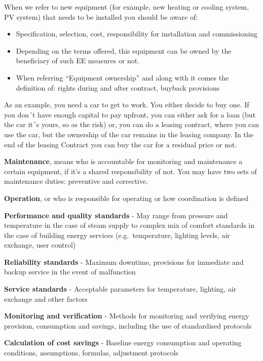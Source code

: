 \documentclass[]{book}
\theoremstyle{definition}
\theoremstyle{definition}
\theoremstyle{definition}
\theoremstyle{remark}
\begin{document}
When we refer to new equipment (for example, new heating or cooling
system, PV system) that needs to be installed you should be aware of:

\begin{itemize}
\item
  Specification, selection, cost, responsibility for installation and
  commissioning
\item
  Depending on the terms offered, this equipment can be owned by the
  beneficiary of such EE measures or not.
\item
  When referring ``Equipment ownership'' and along with it comes the
  definition of: rights during and after contract, buyback provisions
\end{itemize}

As an example, you need a car to get to work. You either decide to buy
one. If you don´t have enough capital to pay upfront, you can either ask
for a loan (but the car it´s yours, so as the risk) or, you can do a
leasing contract, where you can use the car, but the ownership of the
car remains in the leasing company. In the end of the leasing Contract
you can buy the car for a residual price or not.

\textbf{Maintenance}, means who is accountable for monitoring and
maintenance a certain equipment, if it's a shared responsibility of not.
You may have two sets of maintenance duties: preventive and corrective.

\textbf{Operation}, or who is responsible for operating or how
coordination is defined

\textbf{Performance and quality standards} - May range from pressure and
temperature in the case of steam supply to complex mix of comfort
standards in the case of building energy services (e.g.~temperature,
lighting levels, air exchange, user control)

\textbf{Reliability standards} - Maximum downtime, provisions for
immediate and backup service in the event of malfunction

\textbf{Service standards} - Acceptable parameters for temperature,
lighting, air exchange and other factors

\textbf{Monitoring and verification} - Methods for monitoring and
verifying energy provision, consumption and savings, including the use
of standardised protocols

\textbf{Calculation of cost savings} - Baseline energy consumption and
operating conditions, assumptions, formulas, adjustment protocols
\end{document}
